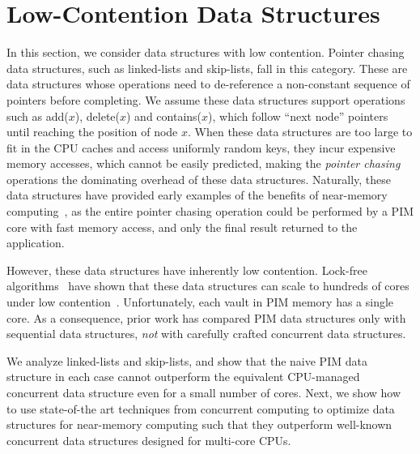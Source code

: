 
\section{Low-Contention Data Structures}
\label{section:pointer_chasing}

In this section, we consider data structures with low contention.
Pointer chasing data structures, such as linked-lists and skip-lists,
fall in this category.  These are data structures whose operations
need to de-reference a non-constant sequence of pointers before
completing.  We assume these data structures support operations such
as add($x$), delete($x$) and contains($x$), which follow ``next node''
pointers until reaching the position of node $x$.  When these data
structures are too large to fit in the CPU caches and access uniformly
random keys, they incur expensive memory accesses, which cannot be
easily predicted, making the \emph{pointer chasing} operations the
dominating overhead of these data structures.  Naturally, these data
structures have provided early examples of the benefits of near-memory
computing~\cite{hsieh2016accelerating, Hashemi:2016}, as the entire
pointer chasing operation could be performed by a PIM core with fast
memory access, and only the final result returned to the application.

However, these data structures have inherently low contention.
Lock-free algorithms~\cite{practicallf, skiplists-concpugh, valois,
  Herlihy08} have shown that these data structures can scale to
hundreds of cores under low contention~\cite{nodereplication}.
Unfortunately, each vault in PIM memory has a single core.  As a
consequence, prior work has compared PIM data structures only with
sequential data structures, \emph{not} with carefully crafted
concurrent data structures.

We analyze linked-lists and skip-lists, and show that the naive PIM
data structure in each case cannot outperform the equivalent
CPU-managed concurrent data structure even for a small number of
cores.  Next, we show how to use state-of-the art techniques from
concurrent computing to optimize data structures for near-memory
computing such that they outperform well-known concurrent data
structures designed for multi-core CPUs.

